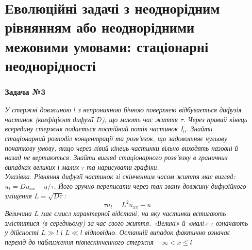 \documentclass[a4paper, 14pt]{extreport}
\begin{document}
\section{Еволюційні задачі з неоднорідним рівнянням або неоднорідними межовими умовами: стаціонарні неоднорідності}

\subsubsection{Задача №3}

\textit{У стержні довжиною $l$ з непроникною бічною поверхнею відбувається дифузія частинок (коефіцієнт дифузії $D$), що мають час життя $\tau$. Через правий кінець всередину стержня подається постійний потік частинок $I_0$. Знайти стаціонарний розподіл концентрації та розв’язок, що задовольняє нульову початкову умову, якщо через лівий кінець частинки вільно виходять назовні й назад не вертаються. Знайти вигляд стаціонарного розв’язку в граничних випадках великих і малих $\tau$ та нарисувати графіки.\\
Указівка. Рівняння дифузії частинок зі скінченним часом життя має вигляд:
$u_t = D u_{xx} - u/\tau$. Його зручно переписати через так звану
довжину дифузійного зміщення $L = \sqrt{D\tau}$: \[\tau u_t = L^2 u_{xx} - u\] Величина $L$ має смисл характерної відстані, на яку частинки встигають зміститися (в середньому) за час свого життя. «Великі» й «малі» $\tau$ означають у дійсності $L \gg l$ і $L \ll l$ відповідно. Останній випадок фактично означає перехід до наближення півнескінченного стержня $-\infty < x \leq l$}
\end{document}
